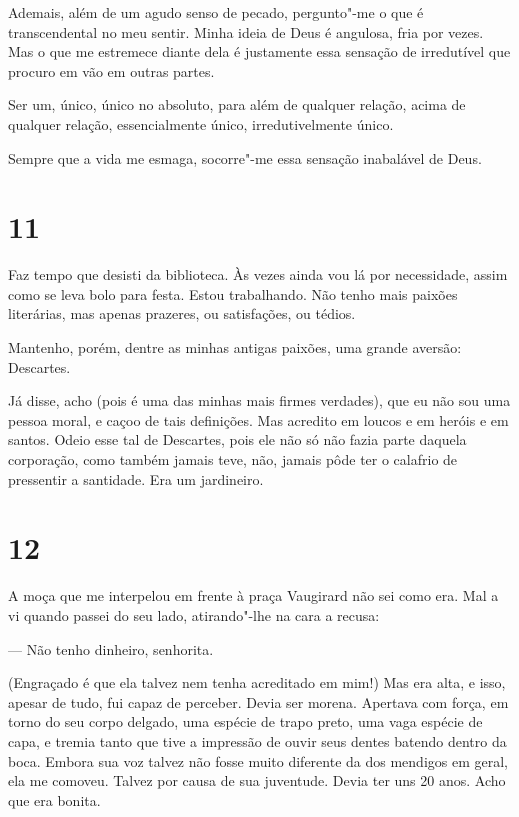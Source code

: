 Ademais, além de um agudo senso de pecado, pergunto"-me o que é
transcendental no meu sentir. Minha ideia de Deus é angulosa, fria por
vezes. Mas o que me estremece diante dela é justamente essa sensação de
irredutível que procuro em vão em outras partes.

Ser um, único, único no absoluto, para além de qualquer relação, acima
de qualquer relação, essencialmente único, irredutivelmente único.

Sempre que a vida me esmaga, socorre"-me essa sensação inabalável de
Deus.

\section{11}

Faz tempo que desisti da biblioteca. Às vezes ainda vou lá por
necessidade, assim como se leva bolo para festa. Estou trabalhando. Não
tenho mais paixões literárias, mas apenas prazeres, ou satisfações, ou
tédios.

Mantenho, porém, dentre as minhas antigas paixões, uma grande aversão:
Descartes.

Já disse, acho (pois é uma das minhas mais firmes verdades), que eu não
sou uma pessoa moral, e caçoo de tais definições. Mas acredito em loucos
e em heróis e em santos. Odeio esse tal de Descartes, pois ele não só
não fazia parte daquela corporação, como também jamais teve, não, jamais
pôde ter o calafrio de pressentir a santidade. Era um jardineiro.

\section{12}

A moça que me interpelou em frente à praça Vaugirard não sei como era.
Mal a vi quando passei do seu lado, atirando"-lhe na cara a recusa:

--- Não tenho dinheiro, senhorita.

(Engraçado é que ela talvez nem tenha acreditado em mim!) Mas era alta,
e isso, apesar de tudo, fui capaz de perceber. Devia ser morena.
Apertava com força, em torno do seu corpo delgado, uma espécie de trapo
preto, uma vaga espécie de capa, e tremia tanto que tive a impressão de
ouvir seus dentes batendo dentro da boca. Embora sua voz talvez não
fosse muito diferente da dos mendigos em geral, ela me comoveu. Talvez
por causa de sua juventude. Devia ter uns 20 anos. Acho que era bonita.

